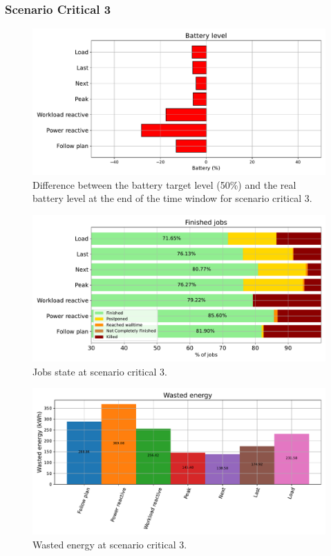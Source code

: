 \clearpage

\subsubsection{Scenario Critical 3}

\begin{figure}[!htb]
    \centering
    \includegraphics[scale=0.55]{Images/Compensations/battery_critical_3.pdf}
    \caption{Difference between the battery target level (50\%) and the real battery level at the end of the time window for scenario critical 3.}
    \label{fig:SoC_critical_3}
\end{figure}

\begin{figure}[!htb]
    \centering
    \includegraphics[scale=0.55]{Images/Compensations/jobs_critical_3.pdf}
    \caption{Jobs state at scenario critical 3.}
    \label{fig:jobs_critical_3}
\end{figure}

\begin{figure}[!htb]
    \centering
    \includegraphics[scale=0.55]{Images/Compensations/energy_critical_3.pdf}
    \caption{Wasted energy at scenario critical 3.}
    \label{fig:energy_critical_3}
\end{figure}

